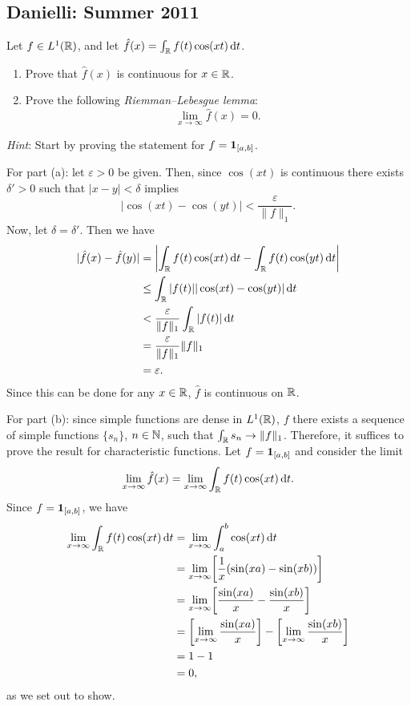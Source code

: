 \subsection{Danielli: Summer 2011}
\setcounter{exercise}{0}
\setcounter{equation}{0}

\begin{problem}
  Let \(f\in L^1(\mathbb{R})\), and let
  \(\hat f(x)=\int_{\mathbb{R}} f(t)\cos(xt)\mathop{}\!\mathrm{d} t\).
  \begin{enumerate}[label=(\alph*),noitemsep]
  \item Prove that \(\hat f(x)\) is continuous for \(x\in\mathbb{R}\).
  \item Prove the following \emph{Riemman--Lebesgue lemma}:
    \[
      \lim_{x\to\infty}\hat f(x)=0.
    \]
  \end{enumerate}
  \emph{Hint}: Start by proving the statement for \(f=\operatorname{\mathbf{1}}_{[a,b]}\).
\end{problem}
\begin{solution}
  For part (a): let \(\varepsilon>0\) be given. Then, since \(\cos(xt)\) is
  continuous there exists \(\delta'>0\) such that \(|x-y|<\delta\) implies
  \[
    |\cos(xt)-\cos(yt)|<\frac{\varepsilon}{\|f\|_1}.
  \]
  Now, let \(\delta=\delta'\). Then we have
  \begin{align*}
    |\hat f(x)-\hat f(y)|
    &=\left|
      \int_{\mathbb{R}} f(t)\cos(xt)\mathop{}\!\mathrm{d} t
      -\int_{\mathbb{R}} f(t)\cos(yt)\mathop{}\!\mathrm{d} t
      \right|\\
    &\leq\int_{\mathbb{R}}|f(t)||\cos(xt)-\cos(yt)|\mathop{}\!\mathrm{d} t\\
    &<\frac{\varepsilon}{\|f\|_1}\int_{\mathbb{R}}|f(t)|\mathop{}\!\mathrm{d} t\\
    &=\frac{\varepsilon}{\|f\|_1}\|f\|_1\\
    &=\varepsilon.
  \end{align*}
  Since this can be done for any \(x\in\mathbb{R}\), \(\hat f\) is continuous on
  \(\mathbb{R}\).

  For part (b): since simple functions are dense in \(L^1(\mathbb{R})\), \(f\)
  there exists a sequence of simple functions \(\{s_n\}\), \(n\in\mathbb{N}\),
  such that \(\int_{\mathbb{R}} s_n\to\|f\|_1\). Therefore, it suffices to prove
  the result for characteristic functions. Let \(f=\operatorname{\mathbf{1}}_{[a,b]}\) and
  consider the limit
  \[
    \lim_{x\to\infty}\hat f(x)=\lim_{x\to\infty}\int_{\mathbb{R}} f(t)\cos(xt)\mathop{}\!\mathrm{d} t.
  \]
  Since \(f=\operatorname{\mathbf{1}}_{[a,b]}\), we have
  \begin{align*}
    \lim_{x\to\infty}\int_{\mathbb{R}} f(t)\cos(xt)\mathop{}\!\mathrm{d} t
    &=\lim_{x\to\infty}\int_a^b\cos(xt)\mathop{}\!\mathrm{d} t\\
    &=\lim_{x\to\infty}\biggl[\frac{1}{x}(\sin(xa)-\sin(xb))\biggr]\\
    &=\lim_{x\to\infty}\biggl[\frac{\sin(xa)}{x}-\frac{\sin(xb)}{x}\biggr]\\
    &=\biggl[\lim_{x\to\infty}\frac{\sin(xa)}{x}\biggr]
      -\biggl[\lim_{x\to\infty}\frac{\sin(xb)}{x}\biggr]\\
    &=1-1\\
    &=0,
  \end{align*}
  as we set out to show.
\end{solution}

